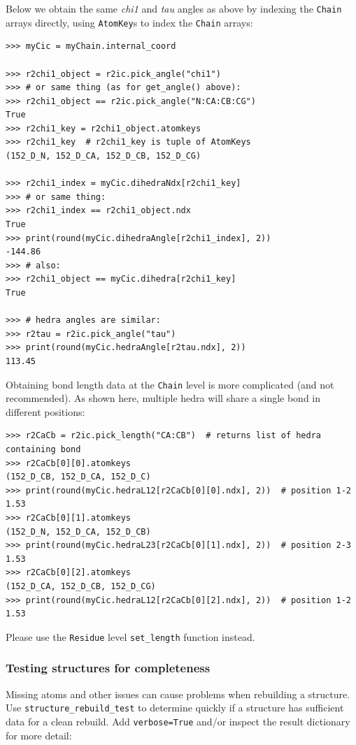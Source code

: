 Below we obtain the same \textit{chi1} and \textit{tau} angles as above by indexing the \texttt{Chain}
arrays directly, using \texttt{AtomKey}s to index the \texttt{Chain} arrays: 

\begin{verbatim}
>>> myCic = myChain.internal_coord

>>> r2chi1_object = r2ic.pick_angle("chi1")
>>> # or same thing (as for get_angle() above):
>>> r2chi1_object == r2ic.pick_angle("N:CA:CB:CG")
True
>>> r2chi1_key = r2chi1_object.atomkeys
>>> r2chi1_key  # r2chi1_key is tuple of AtomKeys
(152_D_N, 152_D_CA, 152_D_CB, 152_D_CG)

>>> r2chi1_index = myCic.dihedraNdx[r2chi1_key]
>>> # or same thing:
>>> r2chi1_index == r2chi1_object.ndx
True
>>> print(round(myCic.dihedraAngle[r2chi1_index], 2))
-144.86
>>> # also:
>>> r2chi1_object == myCic.dihedra[r2chi1_key]
True

>>> # hedra angles are similar:
>>> r2tau = r2ic.pick_angle("tau")
>>> print(round(myCic.hedraAngle[r2tau.ndx], 2))
113.45
\end{verbatim}

Obtaining bond length data at the \texttt{Chain} level is more complicated (and
not recommended).  As shown here, multiple hedra will share a single bond in different
positions:

\begin{verbatim}
>>> r2CaCb = r2ic.pick_length("CA:CB")  # returns list of hedra containing bond
>>> r2CaCb[0][0].atomkeys
(152_D_CB, 152_D_CA, 152_D_C)
>>> print(round(myCic.hedraL12[r2CaCb[0][0].ndx], 2))  # position 1-2
1.53
>>> r2CaCb[0][1].atomkeys
(152_D_N, 152_D_CA, 152_D_CB)
>>> print(round(myCic.hedraL23[r2CaCb[0][1].ndx], 2))  # position 2-3
1.53
>>> r2CaCb[0][2].atomkeys
(152_D_CA, 152_D_CB, 152_D_CG)
>>> print(round(myCic.hedraL12[r2CaCb[0][2].ndx], 2))  # position 1-2
1.53
\end{verbatim}

Please use the \texttt{Residue} level \texttt{set\_length\(\)}
function instead.

\subsubsection{Testing structures for completeness}

Missing atoms and other issues can cause problems when rebuilding a structure.  Use
\texttt{structure\_rebuild\_test\(\)} to determine quickly if a structure has sufficient
data for a clean rebuild.  Add \texttt{verbose=True} and/or inspect the result dictionary
for more detail:

